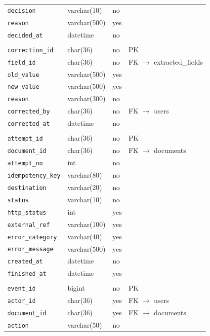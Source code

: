 {\begin{longtable}{L{4.2cm}L{3.4cm}L{1.1cm}L{5.0cm}}
\texttt{decision} & varchar(10) & no & \\
\texttt{reason} & varchar(500) & yes & \\
\texttt{decided\_at} & datetime & no & \\
\\
\texttt{correction\_id} & char(36) & no & PK\\
\texttt{field\_id} & char(36) & no & FK $\rightarrow$ extracted\_fields\\
\texttt{old\_value} & varchar(500) & yes & \\
\texttt{new\_value} & varchar(500) & yes & \\
\texttt{reason} & varchar(300) & no & \\
\texttt{corrected\_by} & char(36) & no & FK $\rightarrow$ users\\
\texttt{corrected\_at} & datetime & no & \\
\\
\texttt{attempt\_id} & char(36) & no & PK\\
\texttt{document\_id} & char(36) & no & FK $\rightarrow$ documents\\
\texttt{attempt\_no} & int & no & \\
\texttt{idempotency\_key} & varchar(80) & no & \\
\texttt{destination} & varchar(20) & no & \\
\texttt{status} & varchar(10) & no & \\
\texttt{http\_status} & int & yes & \\
\texttt{external\_ref} & varchar(100) & yes & \\
\texttt{error\_category} & varchar(40) & yes & \\
\texttt{error\_message} & varchar(500) & yes & \\
\texttt{created\_at} & datetime & no & \\
\texttt{finished\_at} & datetime & yes & \\
\\
\texttt{event\_id} & bigint & no & PK\\
\texttt{actor\_id} & char(36) & yes & FK $\rightarrow$ users\\
\texttt{document\_id} & char(36) & yes & FK $\rightarrow$ documents\\
\texttt{action} & varchar(50) & no & \\

\end{longtable}}
